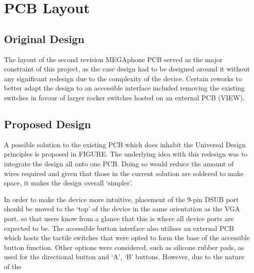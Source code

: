 
\section{PCB Layout}


\subsection{Original Design}

The layout of the second revision MEGAphone PCB served as the major constraint of this project, as the case design had to be designed around it without any significant redesign due to the complexity of the device. Certain reworks to better adapt the design to an accessible interface included removing the existing switches in favour of larger rocker switches hosted on an external PCB (VIEW).

\subsection{Proposed Design}

A possible solution to the existing PCB which does inhabit the Universal Design principles is proposed in FIGURE. 
The underlying idea with this redesign was to integrate the design all onto one PCB. Doing so would reduce the amount of wires required and given that those in the current solution are soldered to make space, it makes the design overall ‘simpler’.

In order to make the device more intuitive, placement of the 9-pin DSUB port should be moved to the ‘top’ of the device in the same orientation as the VGA port, so that users know from a glance that this is where all device ports are expected to be.
The accessible button interface also utilises an external PCB which hosts the tactile switches that were opted to form the base of the accessible button function. 
Other options were considered, such as silicone rubber pads, as used for the directional button and ‘A’, ‘B’ buttons. However, due to the nature of the


